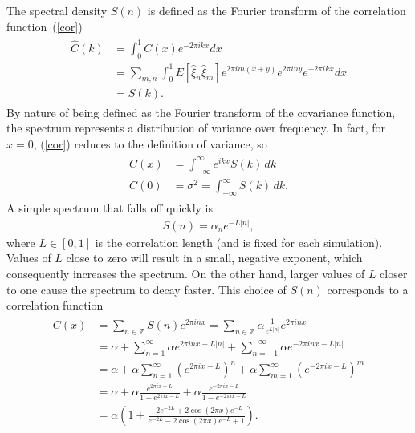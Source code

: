 The spectral density $S(n)$ is defined as the Fourier transform of the
correlation function~(\ref{cor})~\cite{gelhar}
\begin{align*}
\begin{split}
\hat{C}(k) &= \int_{0}^{1}C(x)e^{-2\pi ikx}dx\\
&= \sum_{m,n} \int_{0}^{1} E[\hat{\xi}_n\hat{\xi}_m] e^{2\pi
  im(x+y)}e^{2\pi iny}e^{-2\pi ikx}dx\\
&=S(k).
\end{split}
\end{align*}
By nature of being defined as the Fourier transform of the covariance
function, the spectrum represents a distribution of variance over
frequency. In fact, for $x=0$, (\ref{cor}) reduces to the definition
of variance, so 
\begin{align*}
\begin{split}
C(x) &= \int_{-\infty}^{\infty}e^{ikx}S(k)\,dk\\
C(0) &= \sigma^2 = \int_{-\infty}^{\infty}S(k)\, dk.
\end{split}
\end{align*}
A simple spectrum that falls off quickly is
\begin{align}\label{spec}
S(n)=\alpha_n e^{-L|n|},
\end{align}
where $L \in [0,1]$ is the correlation length (and is fixed
for each simulation). Values of $L$ close to zero will result in a
small, negative exponent, which consequently increases the
spectrum. On the other hand, larger values of $L$ closer to one cause
the spectrum to decay faster. This choice of $S(n)$ corresponds to a correlation function
\begin{align}
\begin{split}
C(x) &= \sum_{n\in \mathbb{Z}}S(n)e^{2\pi inx}=\sum_{n\in \mathbb{Z}}\alpha \frac{1}{e^{L|n|}}e^{2\pi inx}\\
&= \alpha + \sum_{n=1}^{\infty}\alpha e^{2\pi
  inx-L|n|}+\sum_{n=-1}^{-\infty}\alpha e^{-2\pi inx-L|n|}\\
&= \alpha+\alpha \sum_{n=1}^{\infty}(e^{2\pi ix-L})^n+\alpha \sum_{m=1}^{\infty}(e^{-2\pi ix-L})^m\\
&=\alpha + \alpha \frac{e^{2\pi ix-L}}{1-e^{2\pi ix-L}} +\alpha
\frac{e^{-2\pi ix-L}}{1-e^{-2\pi ix-L}}\\
&=\alpha \left(1+ \frac{-2e^{-2L}+2\cos(2\pi x)e^{-L}}{e^{-2L}-2\cos(2\pi x)e^{-L}+1} \right).\\
\end{split}
\end{align}
